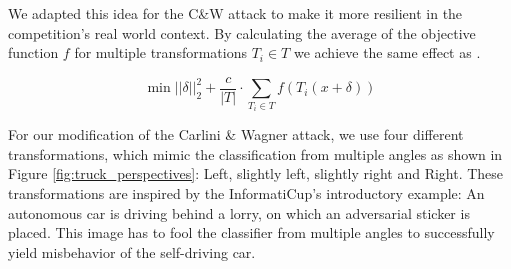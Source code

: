 We adapted this idea for the C\&W attack to make it more resilient in the competition's real world context. By calculating the average of the objective function $f$ for multiple transformations $T_i \in T$ we achieve the same effect as \cite{eykholt2018robust}.

\begin{equation}
\min ||\delta||^2_2 + \frac{c}{|T|} \cdot \sum_{T_i \in T} f(T_i(x + \delta))
\end{equation}

For our modification of the Carlini \& Wagner attack, we use four different transformations,
which mimic the classification from multiple angles as shown in Figure \ref{fig:truck_perspectives}: Left, slightly left, slightly right and Right.
These transformations are inspired by the InformatiCup's introductory example:
An autonomous car is driving behind a lorry, on which an adversarial sticker is placed.
This image has to fool the classifier from multiple angles to successfully yield misbehavior of the self-driving car.

